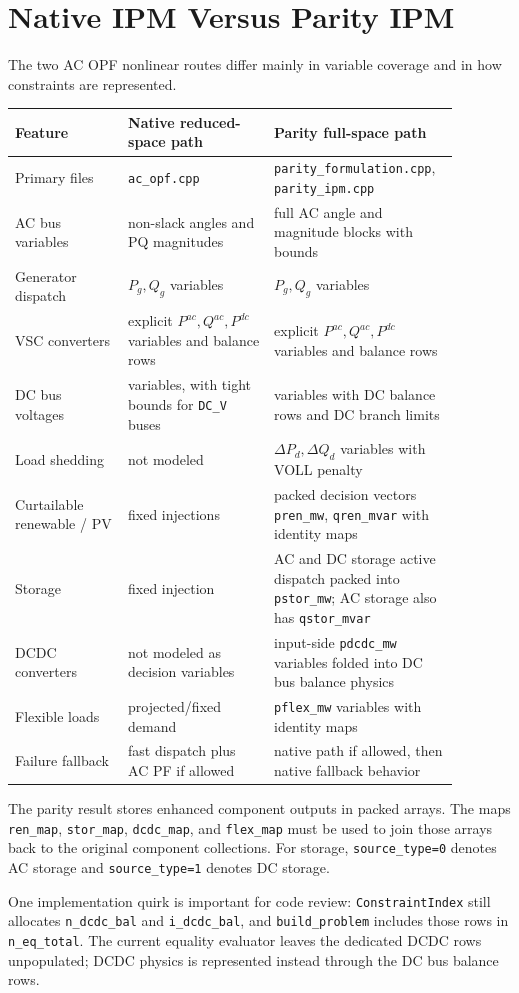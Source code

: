 \section{Native IPM Versus Parity IPM}
\label{sec:native-vs-parity-ipm}

The two AC OPF nonlinear routes differ mainly in variable coverage and in how
constraints are represented.

\begin{longtable}{L{0.24\linewidth}L{0.31\linewidth}L{0.33\linewidth}}
\toprule
Feature & Native reduced-space path & Parity full-space path \\
\midrule
\endhead
Primary files & \texttt{ac\_opf.cpp} & \texttt{parity\_formulation.cpp}, \texttt{parity\_ipm.cpp} \\
AC bus variables & non-slack angles and PQ magnitudes & full AC angle and magnitude blocks with bounds \\
Generator dispatch & \(P_g,Q_g\) variables & \(P_g,Q_g\) variables \\
VSC converters & explicit \(P^{ac},Q^{ac},P^{dc}\) variables and balance rows & explicit \(P^{ac},Q^{ac},P^{dc}\) variables and balance rows \\
DC bus voltages & variables, with tight bounds for \texttt{DC\_V} buses & variables with DC balance rows and DC branch limits \\
Load shedding & not modeled & \(\Delta P_d,\Delta Q_d\) variables with VOLL penalty \\
Curtailable renewable / PV & fixed injections & packed decision vectors \texttt{pren\_mw}, \texttt{qren\_mvar} with identity maps \\
Storage & fixed injection & AC and DC storage active dispatch packed into \texttt{pstor\_mw}; AC storage also has \texttt{qstor\_mvar} \\
DCDC converters & not modeled as decision variables & input-side \texttt{pdcdc\_mw} variables folded into DC bus balance physics \\
Flexible loads & projected/fixed demand & \texttt{pflex\_mw} variables with identity maps \\
Failure fallback & fast dispatch plus AC PF if allowed & native path if allowed, then native fallback behavior \\
\bottomrule
\end{longtable}

The parity result stores enhanced component outputs in packed arrays.  The maps
\texttt{ren\_map}, \texttt{stor\_map}, \texttt{dcdc\_map}, and
\texttt{flex\_map} must be used to join those arrays back to the original
component collections.  For storage, \texttt{source\_type=0} denotes AC storage
and \texttt{source\_type=1} denotes DC storage.

One implementation quirk is important for code review: \texttt{ConstraintIndex}
still allocates \texttt{n\_dcdc\_bal} and \texttt{i\_dcdc\_bal}, and
\texttt{build\_problem} includes those rows in \texttt{n\_eq\_total}.  The
current equality evaluator leaves the dedicated DCDC rows unpopulated; DCDC
physics is represented instead through the DC bus balance rows.
